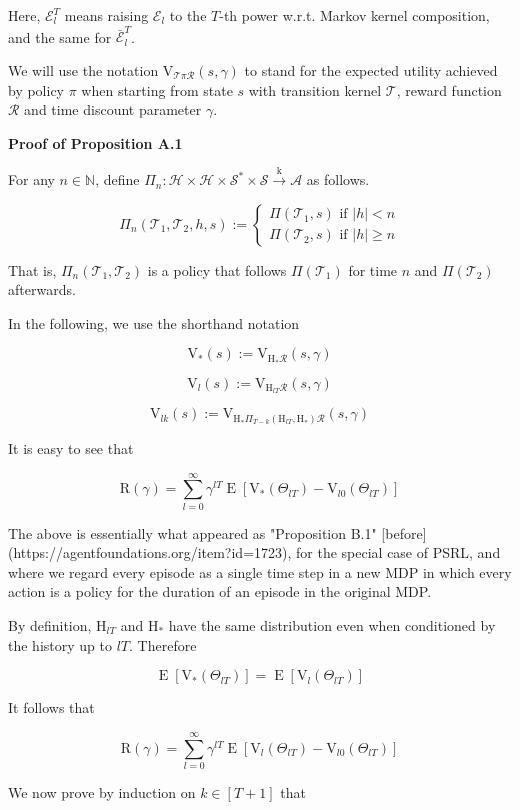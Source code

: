 \documentclass[a4paper]{article}
\newcommand{\Co}[1]{}
\newcommand{\AP}[1]{\left(#1\right)}
\newcommand{\AB}[1]{\left[#1\right]}
\newcommand{\Ea}[2]{\underset{#1}{\operatorname{E}}\AB{#2}}
\newcommand{\Nats}{\mathbb{N}}
\newcommand{\Abs}[1]{\left\vert #1 \right\vert}
\newcommand{\K}{\xrightarrow{\mathrm{k}}}
\newcommand{\St}{\mathcal{S}}
\newcommand{\A}{\mathcal{A}}
\newcommand{\R}{\mathcal{R}}
\newcommand{\T}{\mathcal{T}}
\newcommand{\Hy}{\mathcal{H}}
\newcommand{\V}{\mathrm{V}}
\newcommand{\Reg}{\mathrm{R}}
\newcommand{\SHy}{\mathrm{H}}
\newcommand{\Ev}{\mathcal{E}}
\begin{document}
Here, $\Ev_l^T$ means raising $\Ev_l$ to the $T$-th power w.r.t. Markov kernel composition, and the same for $\bar{\Ev}_l^T$.

We will use the notation $\V_{\T\pi\R}(s,\gamma)$ to stand for the expected utility achieved by policy $\pi$ when starting from state $s$ with transition kernel $\T$, reward function $\R$ and time discount parameter $\gamma$.

\textbf{Proof of Proposition A.1}\Co{b}

For any $n\in\Nats$, define $\Pi_n:\Hy\times\Hy\times\St^*\times\St\K\A$ as follows.

$$\Pi_n\AP{\T_1,\T_2,h,s}:=\begin{cases} \Pi\AP{\T_1,s} \text{ if } \Abs{h}<n \\ \Pi\AP{\T_2,s} \text{ if }\Abs{h} \geq n \end{cases}$$

That is, $\Pi_n\AP{\T_1,\T_2}$ is a policy that follows $\Pi\AP{\T_1}$ for time $n$ and $\Pi\AP{\T_2}$ afterwards. 

In the following, we use the shorthand notation 

$$\V_*(s):=\V_{\SHy_*\R}(s,\gamma)$$

$$\V_l(s):=\V_{\SHy_{lT}\R}(s,\gamma)$$

$$\V_{lk}(s):=\V_{\SHy_{*}\Pi_{T-k}\AP{\SHy_{lT},\SHy_*}\R}\AP{s,\gamma}$$

It is easy to see that

$$\Reg(\gamma)=\sum_{l=0}^\infty{\gamma^{lT}\Ea{}{\V_{*}\AP{\Theta_{lT}}-\V_{l0}\AP{\Theta_{lT}}}}$$

The above is essentially what appeared as "Proposition B.1" [before](https://agentfoundations.org/item?id=1723), for the special case of PSRL, and where we regard every episode as a single time step in a new MDP in which every action is a policy for the duration of an episode in the original MDP.

By definition, $\SHy_{lT}$ and $\SHy_*$ have the same distribution even when conditioned by the history up to $lT$. Therefore

$$\Ea{}{\V_{*}\AP{\Theta_{lT}}}=\Ea{}{\V_{l}\AP{\Theta_{lT}}}$$

It follows that

$$\Reg(\gamma)=\sum_{l=0}^\infty{\gamma^{lT}\Ea{}{\V_{l}\AP{\Theta_{lT}}-\V_{l0}\AP{\Theta_{lT}}}}$$

We now prove by induction on $k\in[T+1]$ that
\end{document}

